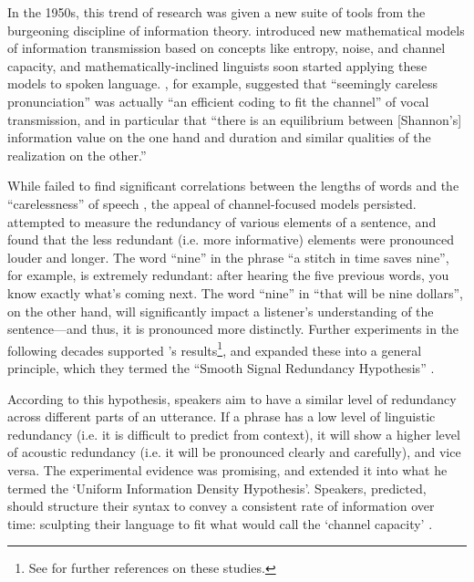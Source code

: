 \documentclass[12pt,twoside,leqno]{article} %
\begin{document}
In the 1950s, this trend of research was given a new suite of tools from the burgeoning discipline of information theory. \citet{shannon} introduced new mathematical models of information transmission based on concepts like entropy, noise, and channel capacity, and mathematically-inclined linguists soon started applying these models to spoken language. \citet[674,676]{karlgren}, for example, suggested that ``seemingly careless pronunciation'' was actually ``an efficient coding to fit the channel'' of vocal transmission, and in particular that ``there is an equilibrium between [Shannon's] information value on the one hand and duration and similar qualities of the realization on the other.''


While \citeauthor{karlgren} failed to find significant correlations between the lengths of words and the ``carelessness'' of speech \citep{karlgren}, the appeal of channel-focused models persisted. \citet{lieberman} attempted to measure the redundancy of various elements of a sentence, and found that the less redundant (i.e. more informative) elements were pronounced louder and longer. The word ``nine'' in the phrase ``a stitch in time saves nine'', for example, is extremely redundant: after hearing the five previous words, you know exactly what's coming next. The word ``nine'' in ``that will be nine dollars'', on the other hand, will significantly impact a listener's understanding of the sentence---and thus, it is pronounced more distinctly. Further experiments in the following decades supported \citeauthor{lieberman}'s results\footnote{See \citet[32]{aylett} for further references on these studies.\citereset}, and \citet{aylett} expanded these into a general principle, which they termed the ``Smooth Signal Redundancy Hypothesis'' \citep[34]{aylett}.

According to this hypothesis, speakers aim to have a similar level of redundancy across different parts of an utterance. If a phrase has a low level of linguistic redundancy (i.e. it is difficult to predict from context), it will show a higher level of acoustic redundancy (i.e. it will be pronounced clearly and carefully), and vice versa. The experimental evidence was promising, and \citet{jaeger} extended it into what he termed the `Uniform Information Density Hypothesis'. Speakers, \citeauthor{jaeger} predicted, should structure their syntax to convey a consistent rate of information over time: sculpting their language to fit what \citet{shannon} would call the `channel capacity' \citep[3]{jaeger}.
\end{document}
